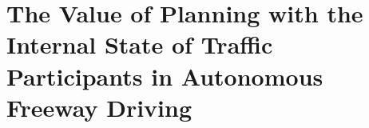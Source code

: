 \chapter{The Value of Planning with the Internal State of Traffic Participants in Autonomous Freeway Driving}
